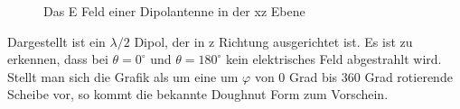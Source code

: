 \begin{figure}[!ht]
\begin{center}
\end{center}
	\caption{Das E Feld einer Dipolantenne in der xz Ebene}
	\label{fig:DipolEFerd}
\end{figure}
Dargestellt ist ein $\lambda/2$ Dipol, der in z Richtung ausgerichtet ist. Es ist zu erkennen, dass bei $\theta = 0 ^\circ $  und $\theta = 180 ^\circ $ kein elektrisches Feld abgestrahlt wird. Stellt man sich die Grafik als um eine um $\varphi$ von 0 Grad bis 360 Grad rotierende Scheibe vor, so kommt die bekannte Doughnut Form zum Vorschein.

